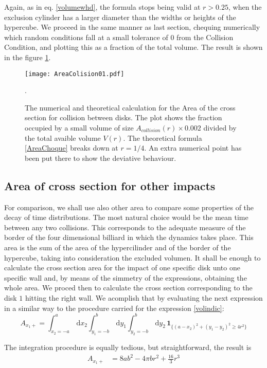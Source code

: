 \documentclass[a4paper,10pt, jcp, aps, preprint]{revtex4-1}
\newcommand{\rd}{\, \mathrm{d}}
\newcommand{\indicator}[1]{\mathbf{1}_{ \{   #1 \} } }
\begin{document}
Again, as in eq. \ref{volumewhd}, the formula stops being valid
at $r>0.25$, when the exclusion cylinder has a larger diameter than
the widths or heights of the hypercube.  
We proceed in the same manner as last section, chequing numerically which
random
conditions fall at a small tolerance of $0$ from the Collision Condition, and
plotting this as a fraction of the total volume. The result is shown in the
figure \ref{AreaChoqueTeoyNum}. 

\begin{figure}
\centering
\texttt{[image: AreaColision01.pdf]}
\caption{The numerical and theoretical calculation for the Area of the cross section
for collision between disks. The plot shows the fraction occupied by a small volume
of size $A_{collision}(r)\times 0.002$ divided by the total
avaible volume $V(r)$. The theoretical formula 
\ref{AreaChoque} breaks down at
$r=1/4$. An extra numerical point has been put there to show the deviative behaviour.}
\label{AreaChoqueTeoyNum}.
\end{figure}



\subsection{Area of cross section for other impacts}

For comparison, we shall use also other area to compare
some properties of the decay of time distributions. The most natural choice
would be the mean time between any two collisions. This corresponds
to the adequate measure of the border of the four dimensional
billiard in which the dynamics takes place. This area is
the sum of the area of the hypercilinder and of the border of the
hypercube, taking into consideration the excluded volumen. 
It shall be enough to calculate the cross section area for
the impact of one specific disk unto one specific wall and,
by means of the simmetry of the expressions, obtaining the whole
area. We proced then to calculate the cross section corresponding to 
the disk $1$ hitting the right wall. We acomplish that by
evaluating the next expression in a similar way to
the procedure carried for the expression \ref{volindic}:
\begin{equation}\label{areaindic}
 A_{x_1+} =  \int_{x_2 = -a}^a \rd x_2 
\int_{y_1 = -b}^b \rd y_1 \int_{y_2 = -b}^b \rd y_2 \, \indicator{ (a-x_2)^2 + (y_1-y_2)^2 \ge 4 r^2 }
\end{equation}

The integration procedure is equally tedious, but
straightforward, the result is 
\begin{align}\label{areax1p}
 A_{x_1+} & = 8 a b^2-4  \pi b r^2 +\frac{16}{3}r^3 
\end{align}
\end{document}
